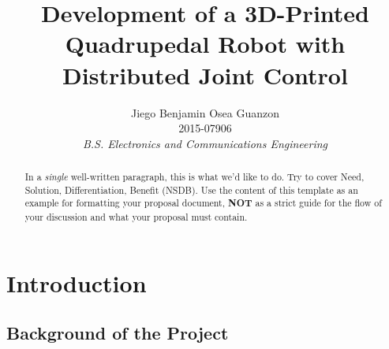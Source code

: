 \documentclass[english]{upeeei}
\begin{document}
\title{Development of a 3D-Printed Quadrupedal Robot with Distributed Joint Control} 

\author{
Jiego Benjamin Osea Guanzon\\ 2015-07906\\ \emph{B.S. Electronics and Communications Engineering}
\and
}




\maketitle 
\begin{abstract} 

In a \emph{single} well-written paragraph, this is what we'd like to do.  Try to cover Need, Solution, Differentiation, Benefit (NSDB).  Use the content of this template as an example for formatting your proposal document, \textbf{NOT} as a strict guide for the flow of your discussion and what your proposal must contain.

\abstractsignature\end{abstract}

\begin{frontmatter} 

\setlength{\parskip}{0pt}

\tableofcontents{}

\listoffigures

\listoftables

\end{frontmatter} 

\def\MASTERDOC{true}

\cleardoublepage{}

\chapter{Introduction\label{cha:Introduction}}

\section{Background of the Project}
\end{document}

